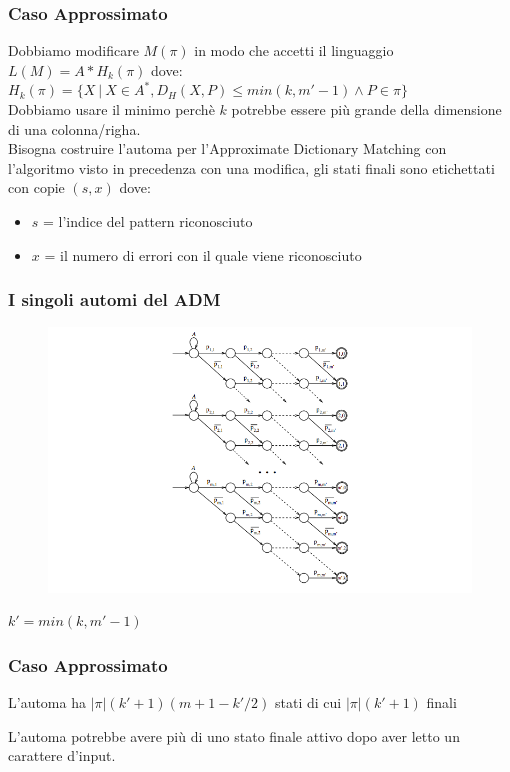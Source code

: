 \documentclass{beamer}
\begin{document}
\begin{frame}
\frametitle{Caso Approssimato}
Dobbiamo modificare $M(\pi)$ in modo che accetti il linguaggio $L(M) = A * H_k(\pi)$ dove: $H_k(\pi) = \{X\ |\ X \in A^*, D_H(X,P) \leq min(k,m'-1) \wedge P\in \pi \}$\\
Dobbiamo usare il minimo perchè $k$ potrebbe essere più grande della dimensione di una colonna/righa.\\
Bisogna costruire l'automa per l'Approximate Dictionary Matching con l'algoritmo visto in precedenza con una modifica, gli stati finali sono etichettati con copie $(s,x)$ dove:
\begin{itemize}
\item $s$ = l'indice del pattern riconosciuto
\item $x$ = il numero di errori con il quale viene riconosciuto
\end{itemize}
\end{frame}

\begin{frame}
\frametitle{I singoli automi del ADM}
\begin{figure}[p]
    \includegraphics[width=1\textwidth]{ADM.png}
\end{figure}

\end{frame}

\begin{frame}

\begin{definition}
$k' = min(k, m'-1)$
\end{definition}

\frametitle{Caso Approssimato}
  \begin{theorem}[]
  L'automa ha $|\pi|(k'+1)(m+1 - k'/2)$ stati di cui $|\pi|(k'+1)$ finali
  \end{theorem}
\begin{theorem}[]
L'automa potrebbe avere più di uno stato finale attivo dopo aver letto un carattere d'input.
\end{theorem}
\end{frame}
\end{document}

